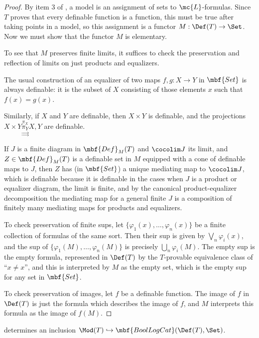 \documentclass[11pt]{article}
\begin{document}
  \begin{proof}
    By item 3 of , a model is an assignment of sets to $\mc{L}$-formulas. Since $T$ proves that every definable function is a function, this must be true after taking points in a model, so this assignment is a functor $ M :\Def(T) \to \Set$. Now we must show that the functor $M$ is elementary.

    To see that $M$ preserves finite limits, it suffices to check the preservation and reflection of limits on just products and equalizers.

  The usual construction of an equalizer of two maps \(f,g : X \to Y\) in \(\mbf{Set}\) is always definable: it is the subset of $X$ consisting of those elements $x$ such that $f(x) = g(x)$.

  Similarly, if $X$ and $Y$ are definable, then $X \times Y$ is definable, and the projections $X \times Y \overset{\pi_X}{\underset{\rightrightarrows}{\pi_Y}} X, Y$ are definable.

  If \(J\) is a finite diagram in \(\mbf{Def}_M(T)\) and \(\cocolim J\) its limit, and \(Z \in \mbf{Def}_{M}(T)\) is a definable set in \(M\) equipped with a cone of definable maps to \(J\), then \(Z\) has (in \(\mbf{Set}\)) a unique mediating map to \(\cocolim J\), which is definable because it is definable in the cases when \(J\) is a product or equalizer diagram, the limit is finite, and by the canonical product-equalizer decomposition the mediating map for a general finite $J$ is a composition of finitely many mediating maps for products and equalizers.

 To check preservation of finite sups, let $\{\varphi_1(x), \dots, \varphi_n(x)\}$ be a finite collection of formulas of the same sort. Then their sup is given by $\bigvee_{n} \varphi_i(x)$, and the sup of $\{\varphi_1(M), \dots, \varphi_n(M)\}$ is precisely $\bigcup_n \varphi_i(M)$. The empty sup is the empty formula, represented in $\Def(T)$ by the $T$-provable equivalence class of ``$x \neq x$'', and this is interpreted by $M$ as the empty set, which is the empty sup for any set in $\mbf{Set}$.

  To check preservation of images, let $f$ be a definable function. The image of $f$ in $\Def(T)$ is just the formula which describes the image of $f$, and $M$ interprets this formula as the image of $f(M)$.
\end{proof}

 determines an inclusion $\Mod(T) \hookrightarrow \mbf{BoolLogCat}(\Def(T), \Set)$.
\end{document}
